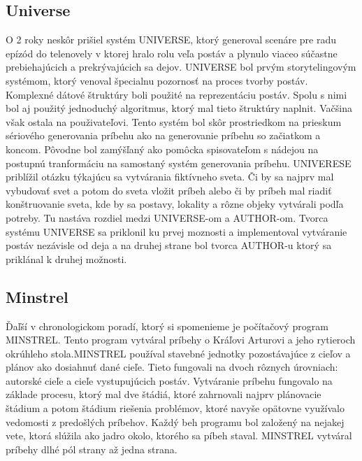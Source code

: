 \subsection{Universe}
O 2 roky neskôr prišiel systém UNIVERSE, ktorý generoval scenáre pre radu epízód do telenovely v ktorej hralo rolu veľa postáv a plynulo viaceo súčastne prebiehajúcich a prekrývajúcich sa dejov. UNIVERSE bol prvým storytelingovým systémom, ktorý venoval špecialnu pozornosť na proces tvorby postáv. Komplexné dátové štruktúry boli použité na reprezentáciu postáv. Spolu s nimi bol aj použitý jednoduchý algoritmus, ktorý mal tieto štruktúry naplnit. Vačšina však ostala na použivateľovi. Tento systém bol skôr prostriedkom na prieskum sériového generovania príbehu ako na generovanie príbehu so začiatkom a koncom. Pôvodne bol zamýšľaný ako pomôcka spisovateľom s nádejou na postupnú tranformáciu na samostaný systém generovania príbehu. UNIVERESE priblížil otázku týkajúcu sa vytvárania fiktívneho sveta. Či by sa najprv mal vybudovať svet a potom do sveta vložit príbeh alebo či by príbeh mal riadiť konštruovanie sveta, kde by sa postavy, lokality a rôzne objeky vytvárali podľa potreby. Tu nastáva rozdiel medzi UNIVERSE-om a AUTHOR-om. Tvorca systému UNIVERSE sa priklonil ku prvej moznosti a implementoval vytváranie postáv nezávisle od deja a na druhej strane bol tvorca AUTHOR-u ktorý sa priklánal k druhej možnosti.\par
\subsection{Minstrel}
Ďaľší v chronologickom poradí, ktorý si spomenieme je počítačový program MINSTREL. Tento program vytváral príbehy o Kráľovi Arturovi a jeho rytieroch okrúhleho stola.MINSTREL používal stavebné jednotky pozostávajúce z cieľov a plánov ako dosiahnuť dané cieľe. Tieto fungovali na dvoch rôznych úrovniach: autorské cieľe a cieľe vystupujúcich postáv. Vytváranie príbehu fungovalo na základe procesu, ktorý mal dve štádiá, ktoré zahrnovali najprv plánovacie štádium a potom štádium riešenia problémov, ktoré navyše opätovne využívalo vedomosti z predošlých príbehov. Každý beh programu bol založený na nejakej vete, ktorá slúžila ako jadro okolo, ktorého sa píbeh staval.  MINSTREL vytváral príbehy dlhé pól strany až jedna strana.\par
